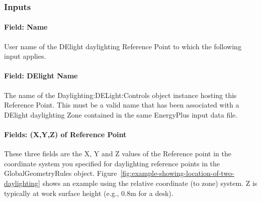\subsubsection{Inputs}\label{inputs-2-008}

\paragraph{Field: Name}\label{field-name-1-007}

User name of the DElight daylighting Reference Point to which the following input applies.

\paragraph{Field: DElight Name}\label{field-delight-name}

The name of the Daylighting:DELight:Controls object instance hosting this Reference Point. This must be a valid name that has been associated with a DElight daylighting Zone contained in the same EnergyPlus input data file.

\paragraph{Fields: (X,Y,Z) of Reference Point}\label{fields-xyz-of-reference-point}

These three fields are the X, Y and Z values of the Reference point in the coordinate system you specified for daylighting reference points in the GlobalGeometryRules object. Figure~\ref{fig:example-showing-location-of-two-daylighting} shows an example using the relative coordinate (to zone) system. Z is typically at work surface height (e.g., 0.8m for a desk).

